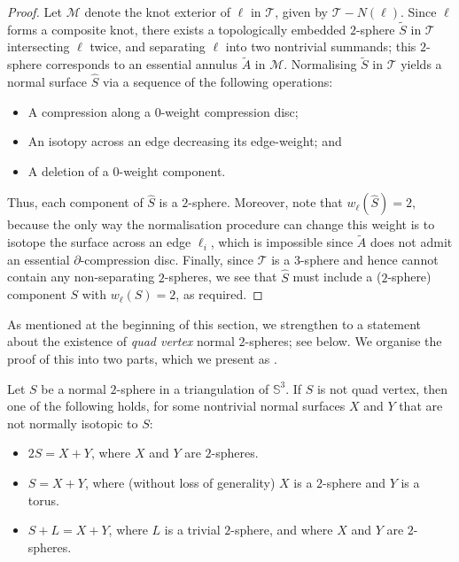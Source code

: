 \documentclass[a4paper,UKenglish,cleveref, autoref, thm-restate]{lipics-v2021}
\newcommand{\tri}{\mathcal{T}}
\newcommand{\manifold}{\mathcal{M}}
\begin{document}
\begin{proof}
Let $\manifold$ denote the knot exterior of $\ell$ in $\tri$, given by $\tri-N(\ell)$.
Since $\ell$ forms a composite knot, there exists a topologically embedded $2$-sphere $\tilde{S}$ in $\tri$ intersecting $\ell$ twice, and separating $\ell$ into two nontrivial summands; this $2$-sphere corresponds to an essential annulus $\tilde{A}$ in $\manifold$.
Normalising $\tilde{S}$ in $\tri$ yields a normal surface $\hat{S}$ via a sequence of the following operations:
\begin{itemize}
\item A compression along a $0$-weight compression disc;
\item An isotopy across an edge decreasing its edge-weight; and%
\item A deletion of a $0$-weight component.
\end{itemize}
Thus, each component of $\hat{S}$ is a $2$-sphere. Moreover, note that $w_
\ell(\hat{S})=2$, because the only way the normalisation procedure can change this weight is to isotope the surface across an edge $\ell_i$,
which is impossible since $\tilde{A}$ does not admit an essential $\partial$-compression disc.
Finally, since $\tri$ is a $3$-sphere and hence cannot contain any non-separating $2$-spheres, we see that $\hat{S}$ must include a ($2$-sphere) component $S$ with $w_\ell(S)=2$, as required.
\end{proof}

As mentioned at the beginning of this section, we strengthen  to a statement about the existence of \emph{quad vertex} normal $2$-spheres;
see  below.
We organise the proof of this into two parts, which we present as .

\begin{lemma}\label{lem:x+y}
Let $S$ be a normal $2$-sphere in a triangulation of $\mathbb{S}^3$.
If $S$ is not quad vertex, then one of the following holds, for some nontrivial normal surfaces $X$ and $Y$ that are not normally isotopic to $S$:
\begin{itemize}
\item
$2S = X+Y$, where $X$ and $Y$ are $2$-spheres.
\item
$S = X+Y$, where (without loss of generality) $X$ is a $2$-sphere and $Y$ is a torus.
\item
$S+L = X+Y$, where $L$ is a trivial $2$-sphere, and where $X$ and $Y$ are $2$-spheres.
\end{itemize}
\end{lemma}
\end{document}

